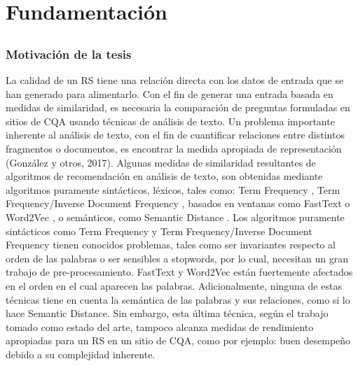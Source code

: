 \chapter*{Fundamentación}\label{ch:fundamentacion}

\section*{}
\addtocounter{section}{1}
\setcounter{subsection}{0}

\subsection{Motivación de la tesis}
 La calidad de un RS tiene una relación directa con los datos de entrada que se han generado para alimentarlo. Con el fin de generar una entrada basada en medidas de similaridad, es necesaria la comparación de preguntas formuladas en sitios de CQA usando técnicas de análisis de texto. Un problema importante inherente al análisis de texto, con el fin de cuantificar relaciones entre distintos fragmentos o documentos, es encontrar la medida apropiada de representación (González y otros, 2017). Algunas medidas de similaridad resultantes de algoritmos de recomendación en análisis de texto, son obtenidas mediante algoritmos puramente sintácticos, léxicos, tales como: Term Frequency \citep{salton5mcgill}, Term Frequency/Inverse Document Frequency \citep{baeza1999modern}, basados en ventanas como FastText \citep{joulin2016fasttext} o Word2Vec \citep{mikolov2013efficient}, o semánticos, como Semantic Distance \citep{li2006sentence}. Los algoritmos puramente sintácticos como Term Frequency y Term Frequency/Inverse Document Frequency tienen conocidos problemas, tales como ser invariantes respecto al orden de las palabras o ser sensibles a stopwords, por lo cual, necesitan un gran trabajo de pre-procesamiento. FastText y Word2Vec están fuertemente afectados en el orden en el cual aparecen las palabras. Adicionalmente, ninguna de estas técnicas tiene en cuenta la semántica de las palabras y sus relaciones, como si lo hace Semantic Distance. Sin embargo, esta última técnica, según el trabajo tomado como estado del arte, tampoco alcanza medidas de rendimiento apropiadas para un RS en un sitio de CQA, como por ejemplo: buen desempeño debido a su complejidad inherente.

